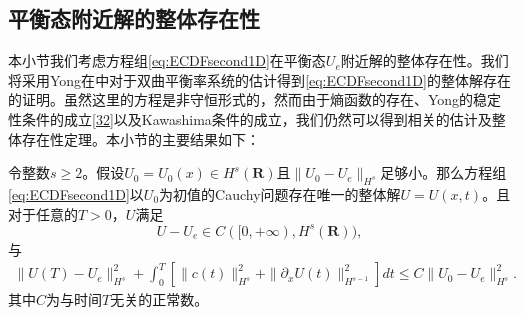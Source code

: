 \subsection{平衡态附近解的整体存在性}
本小节我们考虑方程组\eqref{eq:ECDFsecond1D}在平衡态$U_e$附近解的整体存在性。我们将采用Yong在\cite{yong2004entropy,kawashima2009decay}中对于双曲平衡率系统的估计得到\eqref{eq:ECDFsecond1D}的整体解存在的证明。虽然这里的方程是非守恒形式的，然而由于熵函数的存在、Yong的稳定性条件的成立\eqref{32}以及Kawashima条件的成立，我们仍然可以得到相关的估计及整体存在性定理。本小节的主要结果如下：
\begin{theorem} \label{theoremglobal}
令整数$s \ge 2$。假设$U_0=U_0(x) \in H^s(\mathbf{R})$且$\|U_0 -U_e\|_{H^s}$足够小。那么方程组\eqref{eq:ECDFsecond1D}以$U_0$为初值的Cauchy问题存在唯一的整体解$U=U(x,t)$。且对于任意的$T>0$，$U$满足
$$
U-U_e \in C([0,+\infty),H^s(\mathbf{R})),
$$
与
\begin{eqnarray}\label{41}
\|U(T)-U_e\|^2_{H^s} + \int_0^T \left[ \|c(t)\|^2_{H^s} + \|\partial_x U(t)\|^2_{H^{s-1}} \right] dt \le C \|U_0 -U_e\|^2_{H^s}.
\end{eqnarray}
其中$C$为与时间$T$无关的正常数。
\end{theorem}

